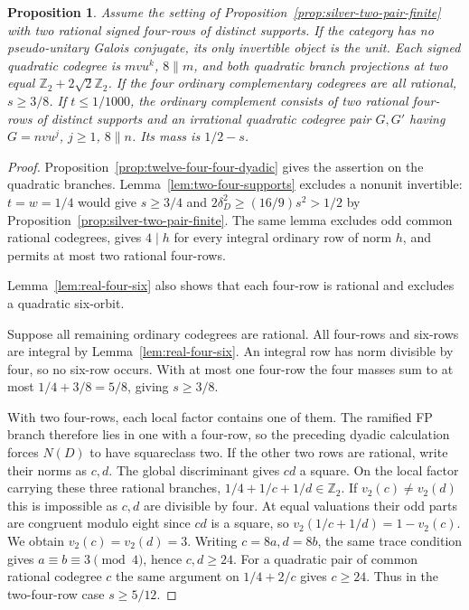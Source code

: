 \documentclass[11pt,reqno]{amsart}
\newtheorem{proposition}[theorem]{Proposition}
\theoremstyle{remark}\newtheorem{remark}[theorem]{Remark}
\numberwithin{equation}{section}
\begin{document}
\begin{proposition}\label{prop:silver-distinct-four}
Assume the setting of Proposition~\ref{prop:silver-two-pair-finite}
with two rational signed four-rows of distinct supports. If the
category has no pseudo-unitary Galois conjugate, its only invertible
object is the unit. Each signed quadratic codegree is $mvu^k$,
$8\parallel m$, and both quadratic branch projections at two
equal $\mathbb Z_2+2\sqrt2\mathbb Z_2$. If the four ordinary
complementary codegrees are all rational, $s\ge3/8$.
If $t\le1/1000$, the ordinary complement consists of two rational
four-rows of distinct supports and an irrational quadratic
codegree pair $G,G'$ having $G=nv u^j$, $j\ge1$, $8\parallel n$.
Its mass is $1/2-s$.
\end{proposition}
\begin{proof}
Proposition~\ref{prop:twelve-four-four-dyadic} gives the assertion
on the quadratic branches. Lemma~\ref{lem:two-four-supports} excludes
a nonunit invertible: $t=w=1/4$ would give $s\ge3/4$ and
$2\delta_D^2\ge(16/9)s^2>1/2$ by
Proposition~\ref{prop:silver-two-pair-finite}. The same lemma excludes
odd common rational codegrees, gives $4\mid h$ for every integral
ordinary row of norm $h$, and permits at most two rational four-rows.

Lemma~\ref{lem:real-four-six} also shows that each four-row is
rational and excludes a quadratic six-orbit.

Suppose all remaining ordinary codegrees are rational. All four-rows and six-rows are integral by Lemma~\ref{lem:real-four-six}.
An integral row has norm divisible by four, so no six-row occurs.
With at most one four-row the four masses sum to at most
$1/4+3/8=5/8$, giving $s\ge3/8$.

With two four-rows, each local factor contains one of them.
The ramified FP branch therefore lies in one with a four-row, so
the preceding dyadic calculation forces $N(D)$ to have squareclass
two. If the other two rows are rational, write their norms as $c,d$.
The global discriminant gives $cd$ a square. On the local factor
carrying these three rational branches,
$1/4+1/c+1/d\in\mathbb Z_2$. If $v_2(c)\ne v_2(d)$ this is impossible
as $c,d$ are divisible by four. At equal valuations their odd parts
are congruent modulo eight since $cd$ is a square, so
$v_2(1/c+1/d)=1-v_2(c)$. We obtain $v_2(c)=v_2(d)=3$.
Writing $c=8a,d=8b$, the same trace condition gives
$a\equiv b\equiv3\pmod4$, hence $c,d\ge24$. For a quadratic pair
of common rational codegree $c$ the same argument on $1/4+2/c$
gives $c\ge24$. Thus in the two-four-row case $s\ge5/12$.


\end{proof}
\end{document}
